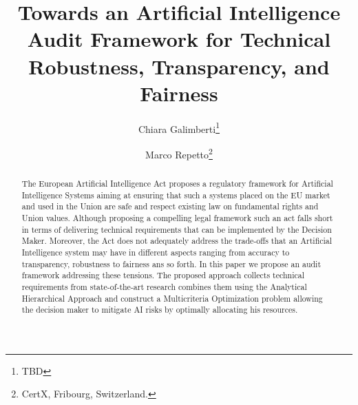 \documentclass{article}
\title{Towards an Artificial Intelligence Audit Framework for Technical Robustness, Transparency, and Fairness}
\author{Chiara Galimberti\thanks{TBD} \and Marco Repetto\thanks{CertX, Fribourg, Switzerland.}}
\begin{document}
\maketitle
\begin{abstract}
	The European Artificial Intelligence Act proposes a regulatory framework for Artificial Intelligence Systems aiming at ensuring that such a systems placed on the EU market and used in the Union are safe and respect existing law on fundamental rights and Union values.
	Although proposing a compelling legal framework such an act falls short in terms of delivering technical requirements that can be implemented by the Decision Maker.
	Moreover, the Act does not adequately address the trade-offs that an Artificial Intelligence system may have in different aspects ranging from accuracy to transparency, robustness to fairness ans so forth.
	In this paper we propose an audit framework addressing these tensions. 
	The proposed approach collects technical requirements from state-of-the-art research combines them using the Analytical Hierarchical Approach and construct a Multicriteria Optimization problem allowing the decision maker to mitigate AI risks by optimally allocating his resources. 
\end{abstract}








\printbibliography

\begin{appendices}
	
\end{appendices}
\end{document}
